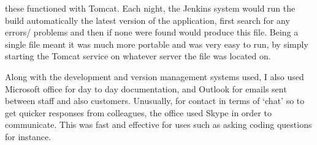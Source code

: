 \documentclass[12pt]{article}
\begin{document}
these functioned with Tomcat. Each night, the Jenkins system would run the build automatically the latest version of the
application, first search for any errors/ problems and then if none were found would produce this file. Being a single
file meant it was much more portable and was very easy to run, by simply starting the Tomcat service on whatever server
the file was located on.  \\ \par \noindent
Along with the development and version management systems used, I also used Microsoft office for day to day
documentation, and Outlook for emails sent between staff and also customers. Unusually, for contact in terms of ‘chat’
so to get quicker responses from colleagues, the office used Skype in order to communicate. This was fast and effective
for uses such as asking coding questions for instance.

\end{document}
